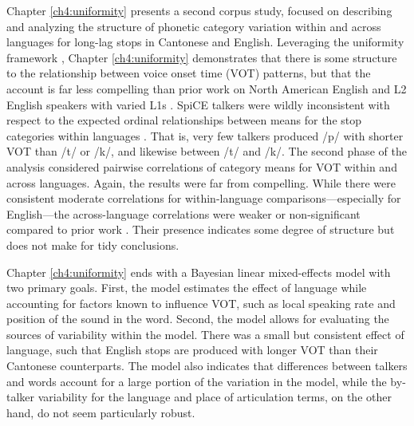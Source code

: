 Chapter \ref{ch4:uniformity} presents a second corpus study, focused on describing and analyzing the structure of phonetic category variation within and across languages for long-lag stops in Cantonese and English. Leveraging the uniformity framework \citep{chodroff_2017_structure}, Chapter \ref{ch4:uniformity} demonstrates that there is some structure to the relationship between voice onset time (VOT) patterns, but that the account is far less compelling than prior work on North American English \citep{chodroff_2017_structure} and L2 English speakers with varied L1s \citep{chodroff_2019_l2}. SpiCE talkers were wildly inconsistent with respect to the expected ordinal relationships between means for the stop categories within languages \citep{chodroff_2017_structure, cho_1999_vot, lisker_1964_vot}. That is, very few talkers produced /p/ with shorter VOT than /t/ or /k/, and likewise between /t/ and /k/. The second phase of the analysis considered pairwise correlations of category means for VOT within and across languages. Again, the results were far from compelling. While there were consistent moderate correlations for within-language comparisons---especially for English---the across-language correlations were weaker or non-significant compared to prior work \citep{chodroff_2017_structure, chodroff_2019_l2}. Their presence indicates some degree of structure but does not make for tidy conclusions. 

Chapter \ref{ch4:uniformity} ends with a Bayesian linear mixed-effects model with two primary goals. First, the model estimates the effect of language while accounting for factors known to influence VOT, such as local speaking rate and position of the sound in the word. Second, the model allows for evaluating the sources of variability within the model. There was a small but consistent effect of language, such that English stops are produced with longer VOT than their Cantonese counterparts. The model also indicates that differences between talkers and words account for a large portion of the variation in the model, while the by-talker variability for the language and place of articulation terms, on the other hand, do not seem particularly robust. 

